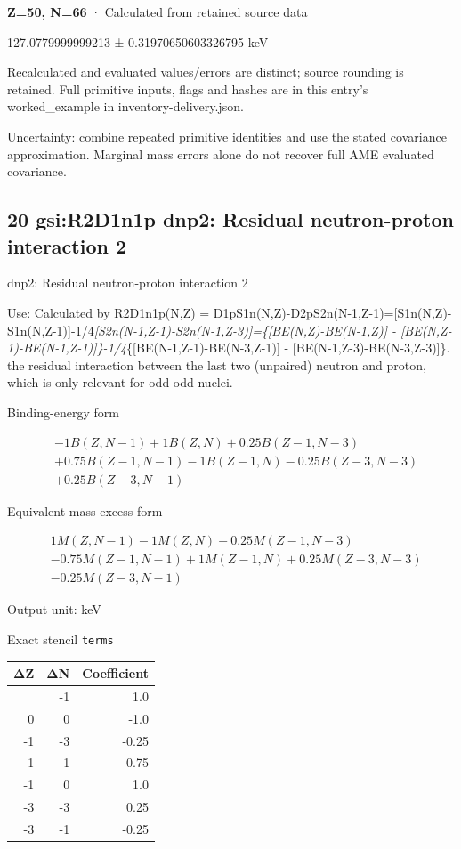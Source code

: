 \documentclass[
  11pt,
  letterpaper,
]{article}
\begin{document}
\textbf{Z=50, N=66} · Calculated from retained source data

127.0779999999213 ± 0.31970650603326795 keV

Recalculated and evaluated values/errors are distinct; source rounding
is retained. Full primitive inputs, flags and hashes are in this entry's
worked\_example in inventory-delivery.json.

Uncertainty: combine repeated primitive identities and use the stated
covariance approximation. Marginal mass errors alone do not recover full
AME evaluated covariance.

\subsection{20 gsi:R2D1n1p dnp2: Residual neutron-proton interaction
2}\label{gsir2d1n1p-dnp2-residual-neutron-proton-interaction-2}

dnp2: Residual neutron-proton interaction 2

Use: Calculated by R2D1n1p(N,Z) =
D1pS1n(N,Z)-D2pS2n(N-1,Z-1)={[}S1n(N,Z)-S1n(N,Z-1){]}-1/4\emph{{[}S2n(N-1,Z-1)-S2n(N-1,Z-3){]}=\{{[}BE(N,Z)-BE(N-1,Z){]}
- {[}BE(N,Z-1)-BE(N-1,Z-1){]}\}-1/4}\{{[}BE(N-1,Z-1)-BE(N-3,Z-1){]} -
{[}BE(N-1,Z-3)-BE(N-3,Z-3){]}\}. the residual interaction between the
last two (unpaired) neutron and proton, which is only relevant for
odd-odd nuclei.

Binding-energy form

\[
\begin{aligned}
& -1B(Z,N-1)+1B(Z,N)+0.25B(Z-1,N-3) \\
& +0.75B(Z-1,N-1)-1B(Z-1,N)-0.25B(Z-3,N-3) \\
& +0.25B(Z-3,N-1)
\end{aligned}
\]

Equivalent mass-excess form

\[
\begin{aligned}
& 1M(Z,N-1)-1M(Z,N)-0.25M(Z-1,N-3) \\
& -0.75M(Z-1,N-1)+1M(Z-1,N)+0.25M(Z-3,N-3) \\
& -0.25M(Z-3,N-1)
\end{aligned}
\]

Output unit: keV

Exact stencil \texttt{terms}

\begin{longtable}[]{@{}rrr@{}}
\toprule\noalign{}
ΔZ & ΔN & Coefficient \\
\midrule\noalign{}
\endhead
\bottomrule\noalign{}
\endlastfoot
0 & -1 & 1.0 \\
0 & 0 & -1.0 \\
-1 & -3 & -0.25 \\
-1 & -1 & -0.75 \\
-1 & 0 & 1.0 \\
-3 & -3 & 0.25 \\
-3 & -1 & -0.25 \\
\end{longtable}
\end{document}
